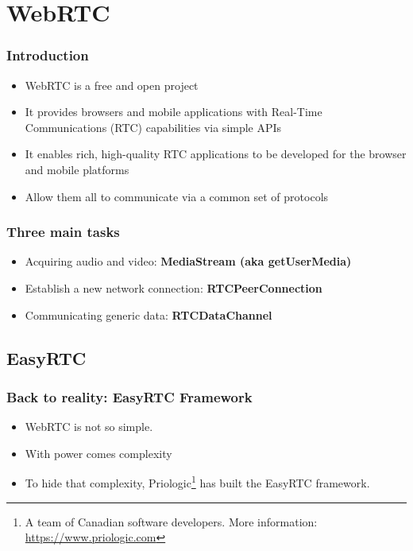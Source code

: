\documentclass{beamer}
\begin{document}
\section{WebRTC}

\begin{frame}
\frametitle{Introduction}

\begin{itemize}
  \item WebRTC is a free and open project 
  \item It provides browsers and mobile applications with Real-Time Communications (RTC) capabilities via simple APIs
  \item It enables rich, high-quality RTC applications to be developed for the browser and mobile platforms
  \item Allow them all to communicate via a common set of protocols
\end{itemize}

\end{frame}

\begin{frame}\frametitle{Three main tasks}
\begin{itemize}
  \item Acquiring audio and video: \textbf{\textsf{MediaStream} (aka getUserMedia)}
  \item Establish a new network connection: \textbf{\textsf{RTCPeerConnection}}
  \item Communicating generic data: \textbf{\textsf{RTCDataChannel}}
\end{itemize}    
\end{frame}

\subsection{EasyRTC}

\begin{frame}\frametitle{Back to reality: EasyRTC Framework}
\begin{itemize}
  \item WebRTC is not so simple.
  \item With power comes complexity
  \item To hide that complexity, Priologic\footnote{A team of Canadian software developers. More information: \url{https://www.priologic.com}} has built the EasyRTC framework.
\end{itemize}
\end{frame}
\end{document}
